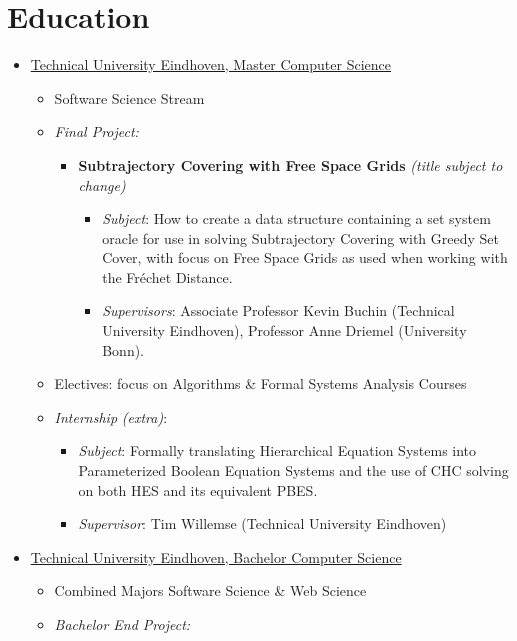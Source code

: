 \documentclass[11pt]{article}
\begin{document}
	\section*{Education}
	\begin{itemize}
		\item \underline{Technical University Eindhoven, Master Computer Science} \hfill \textit{\color{Blue}{09/2018-08/2021}}
		\begin{itemize}[noitemsep, nolistsep]
		\item Software Science Stream
		\item \emph{Final Project:}
		\begin{itemize}
		\item \textbf{Subtrajectory Covering with Free Space Grids} \emph{(title subject to change)}
		\begin{itemize}
		\item \emph{Subject}: How to create a data structure containing a set system oracle for use in solving Subtrajectory Covering with Greedy Set Cover, with focus on Free Space Grids as used when working with the Fréchet Distance.
		\item \emph{Supervisors}: Associate Professor Kevin Buchin (Technical University Eindhoven), Professor Anne Driemel (University Bonn).
		\end{itemize}
		\end{itemize}
		\item Electives: focus on Algorithms \& Formal Systems Analysis Courses
		\item \emph{Internship} \emph{(extra)}:
		\begin{itemize}
		\item \emph{Subject}: Formally translating Hierarchical Equation Systems into Parameterized Boolean Equation Systems and the use of CHC solving on both HES and its equivalent PBES.
		\item \emph{Supervisor}: Tim Willemse (Technical University Eindhoven)
		\end{itemize}
		\end{itemize}
		\newpage
		\item \underline{Technical University Eindhoven, Bachelor Computer Science} \hfill \textit{\color{Blue}{09/2015-07/2018}}
		\begin{itemize}[noitemsep, nolistsep]
			\item Combined Majors Software Science \& Web Science
			\item \textit{Bachelor End Project:}
			\begin{itemize}

\end{itemize}
\end{itemize}
\end{itemize}
\end{document}
